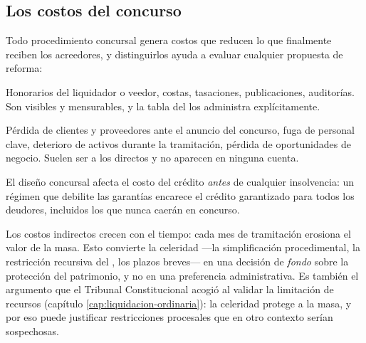 \subsection{Los costos del concurso}

Todo procedimiento concursal genera costos que reducen lo que finalmente reciben los acreedores, y
distinguirlos ayuda a evaluar cualquier propuesta de reforma:

\begin{description}[leftmargin=0pt,style=nextline,font=\sffamily\bfseries]
  \item[Costos directos] Honorarios del liquidador o veedor, costas, tasaciones, publicaciones,
  auditorías. Son visibles y mensurables, y la tabla del  los administra explícitamente.

  \item[Costos indirectos] Pérdida de clientes y proveedores ante el anuncio del concurso, fuga de
  personal clave, deterioro de activos durante la tramitación, pérdida de oportunidades de negocio.
  Suelen ser  a los directos y no aparecen en ninguna cuenta.

  \item[Costos \emph{ex ante}] El diseño concursal afecta el costo del crédito \emph{antes} de
  cualquier insolvencia: un régimen que debilite las garantías encarece el crédito garantizado para
  todos los deudores, incluidos los que nunca caerán en concurso.
\end{description}

\begin{foco}
Los costos indirectos crecen con el tiempo: cada mes de tramitación erosiona el valor de la masa.
Esto convierte la celeridad ---la simplificación procedimental, la restricción recursiva del
, los plazos breves--- en una decisión de \emph{fondo} sobre la protección del patrimonio, y
no en una preferencia administrativa. Es también el argumento que el Tribunal Constitucional acogió
al validar la limitación de recursos (capítulo \ref{cap:liquidacion-ordinaria}): la celeridad
protege a la masa, y por eso puede justificar restricciones procesales que en otro contexto serían
sospechosas.
\end{foco}
